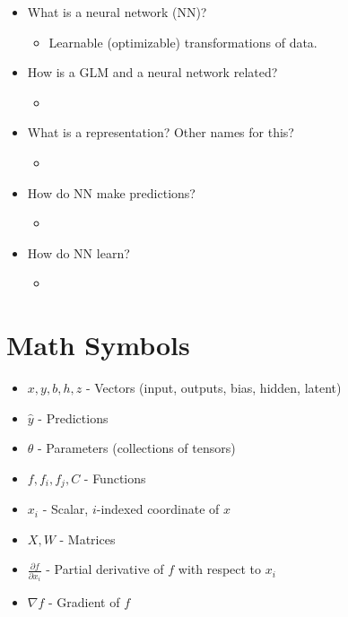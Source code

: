 \begin{summary}
    \begin{itemize}
        \item What is a neural network (NN)?
        \begin{itemize}
            \item Learnable (optimizable) transformations of data.
        \end{itemize}
        \item How is a GLM and a neural network related?
        \begin{itemize}
            \item 
        \end{itemize}
        \item What is a representation? Other names for this?
        \begin{itemize}
            \item 
        \end{itemize}
        \item How do NN make predictions?
        \begin{itemize}
            \item 
        \end{itemize}
        \item How do NN learn?
        \begin{itemize}
            \item 
        \end{itemize}
    \end{itemize}
\end{summary}

\section{Math Symbols}
\begin{definition}
    \begin{itemize}
        \item \(x, y, b, h, z\) - Vectors (input, outputs, bias, hidden, latent)
        \item \(\hat{y}\) - Predictions
        \item \(\theta\) - Parameters (collections of tensors)
        \item \(f, f_i, f_j, C\) - Functions
        \item \(x_i\) - Scalar, \(i\)-indexed coordinate of \(x\)
        \item \(X, W\) - Matrices
        \item \(\frac{\partial f}{\partial x_i}\) - Partial derivative of \(f\) with respect to \(x_i\)
        \item \(\nabla f\) - Gradient of \(f\)
    \end{itemize}     
\end{definition}


